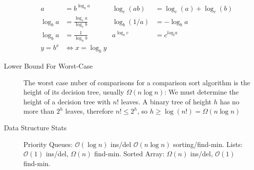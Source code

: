 \documentclass[8pt]{article}
\begin{document}
\begin{multicols}{2}
\begin{description}
\begin{equation*}
\begin{aligned}
        a &= b^{\log_b a} &
        \log_c(ab) &= \log_c(a) + \log_c(b) \\
        \log_b a &= \frac{\log_c a}{\log_c b} &
        \log_b(1/a) &= -\log_b a \\
        \log_b a &= \frac{1}{\log_a b} &
        a^{\log_b c} &= c^{log_b a} \\
        y = b^x &\Leftrightarrow x=\log_b y &
      \end{aligned}
    \end{equation*}
  \item[Lower Bound For Worst-Case] The worst case nuber of
    comparisons for a comparison sort algorithm is the height of its
    decision tree, usually $\Omega(n\log n)$: We must determine the
    height of a decision tree with $n!$ leaves. A binary tree of
    height $h$ has no more than $2^h$ leaves, therefore $n!\le2^h$, so
    $h\ge\log(n!) = \Omega(n\log n)$
  \item[Data Structure Stats] Priority Queues: $\mathcal{O}(\log n)$
    ins/del $\mathcal{O}(n\log n)$ sorting/find-min. Lists:
    $\mathcal{O}(1)$ ins/del, $\Omega(n)$ find-min. Sorted Array:
    $\Omega(n)$ ins/del, $\mathcal{O}(1)$ find-min.
  \end{description} %
\end{multicols}
\end{document}
